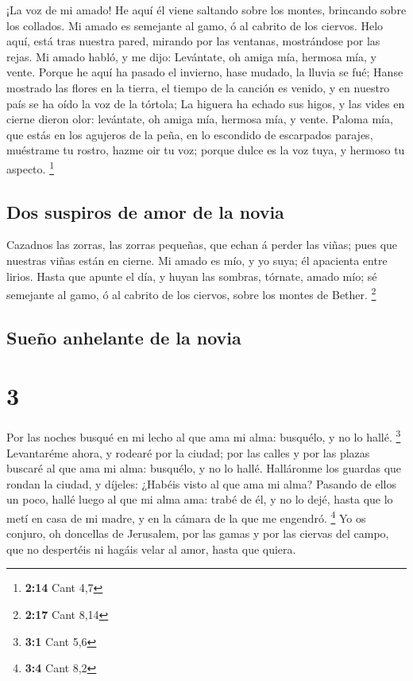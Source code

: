  ¡La voz de mi amado! He aquí él viene saltando sobre los
montes, brincando sobre los collados.  Mi amado es
semejante al gamo, ó al cabrito de los ciervos. Helo aquí, está tras
nuestra pared, mirando por las ventanas, mostrándose por las rejas.
 Mi amado habló, y me dijo: Levántate, oh amiga mía,
hermosa mía, y vente.  Porque he aquí ha pasado el
invierno, hase mudado, la lluvia se fué;  Hanse mostrado
las flores en la tierra, el tiempo de la canción es venido, y en nuestro
país se ha oído la voz de la tórtola;  La higuera ha
echado sus higos, y las vides en cierne dieron olor: levántate, oh amiga
mía, hermosa mía, y vente.  Paloma mía, que estás en los
agujeros de la peña, en lo escondido de escarpados parajes, muéstrame tu
rostro, hazme oir tu voz; porque dulce es la voz tuya, y hermoso tu
aspecto. \footnote{\textbf{2:14} Cant 4,7}

\hypertarget{dos-suspiros-de-amor-de-la-novia}{%
\subsection{Dos suspiros de amor de la
novia}\label{dos-suspiros-de-amor-de-la-novia}}

 Cazadnos las zorras, las zorras pequeñas, que echan á
perder las viñas; pues que nuestras viñas están en cierne.
 Mi amado es mío, y yo suya; él apacienta entre lirios.
 Hasta que apunte el día, y huyan las sombras, tórnate,
amado mío; sé semejante al gamo, ó al cabrito de los ciervos, sobre los
montes de Bether. \footnote{\textbf{2:17} Cant 8,14}

\hypertarget{sueuxf1o-anhelante-de-la-novia}{%
\subsection{Sueño anhelante de la
novia}\label{sueuxf1o-anhelante-de-la-novia}}

\hypertarget{section-2}{%
\section{3}\label{section-2}}

 Por las noches busqué en mi lecho al que ama mi alma:
busquélo, y no lo hallé. \footnote{\textbf{3:1} Cant 5,6} 
Levantaréme ahora, y rodearé por la ciudad; por las calles y por las
plazas buscaré al que ama mi alma: busquélo, y no lo hallé.
 Halláronme los guardas que rondan la ciudad, y díjeles:
¿Habéis visto al que ama mi alma?  Pasando de ellos un
poco, hallé luego al que mi alma ama: trabé de él, y no lo dejé, hasta
que lo metí en casa de mi madre, y en la cámara de la que me engendró.
\footnote{\textbf{3:4} Cant 8,2}  Yo os conjuro, oh
doncellas de Jerusalem, por las gamas y por las ciervas del campo, que
no despertéis ni hagáis velar al amor, hasta que quiera.

